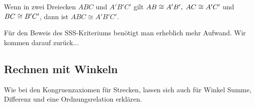 \begin{thm} \label{thm:satz.s1n}
Wenn in zwei Dreiecken $ABC$ und $A'B'C'$ gilt
${AB}\cong{A'B'},\;{AC}\cong{A'C'}$ und
${BC}\cong{B'C'}$, dann ist $ABC \cong A'B'C'$.
\end{thm}


F\"{u}r den Beweis des SSS-Kriteriums ben\"{o}tigt man erheblich
mehr Aufwand. Wir kommen darauf zurück...







\subsection*{Rechnen mit Winkeln}


Wie bei den Kongruenzaxiomen für Strecken, lassen sich auch für Winkel
Summe, Differenz und eine Ordnungsrelation erklären.


